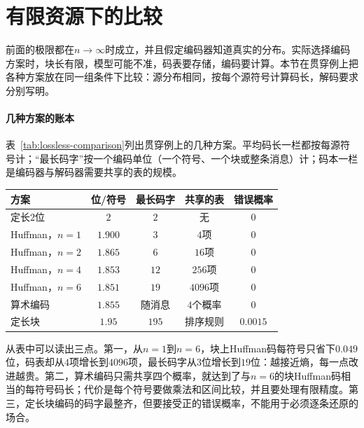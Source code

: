 \section{有限资源下的比较}
\label{sec:lossless-finite-resources}

前面的极限都在$n\to\infty$时成立，并且假定编码器知道真实的分布。实际选择编码方案时，块长有限，模型可能不准，码表要存储，编码要计算。本节在贯穿例上把各种方案放在同一组条件下比较：源分布相同，按每个源符号计算码长，解码要求分别写明。

\paragraph{几种方案的账本}
表~\ref{tab:lossless-comparison}列出贯穿例上的几种方案。平均码长一栏都按每源符号计；“最长码字”按一个编码单位（一个符号、一个块或整条消息）计；码本一栏是编码器与解码器需要共享的表的规模。

\begin{BookInlineTable}
 \centering
 \caption{贯穿例$p=(0.4,0.3,0.2,0.1)$上的几种编码方案，$H=1.846$。算术编码一行为图~\ref{fig:lossless-arith-length}中长$400$、长度已知的那条消息的实测值，码长小于消息自信息加$2$；定长块一行为图~\ref{fig:lossless-fixed-rate-error}中$R=1.95$、$n=100$的最优定长码。}
 \label{tab:lossless-comparison}
 \begin{tabular}{lcccc}
  \toprule
  方案 & 位/符号 & 最长码字 & 共享的表 & 错误概率\\
  \midrule
  定长$2$位 & $2$ & $2$ & 无 & $0$\\
  Huffman，$n=1$ & $1.900$ & $3$ & $4$项 & $0$\\
  Huffman，$n=2$ & $1.865$ & $6$ & $16$项 & $0$\\
  Huffman，$n=4$ & $1.853$ & $12$ & $256$项 & $0$\\
  Huffman，$n=6$ & $1.851$ & $19$ & $4096$项 & $0$\\
  算术编码 & $1.855$ & 随消息 & $4$个概率 & $0$\\
  定长块 & $1.95$ & $195$ & 排序规则 & $0.0015$\\
  \bottomrule
 \end{tabular}
\end{BookInlineTable}

从表中可以读出三点。第一，从$n=1$到$n=6$，块上Huffman码每符号只省下$0.049$位，码表却从$4$项增长到$4096$项，最长码字从$3$位增长到$19$位：越接近熵，每一点改进越贵。第二，算术编码只需共享四个概率，就达到了与$n=6$的块Huffman码相当的每符号码长；代价是每个符号要做乘法和区间比较，并且要处理有限精度。第三，定长块编码的码字最整齐，但要接受正的错误概率，不能用于必须逐条还原的场合。


